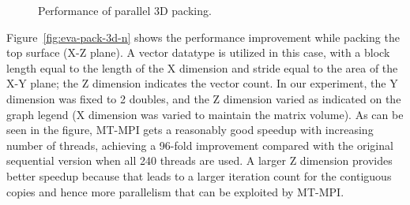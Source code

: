 \begin{figure}
\begin{center}
\end{center}
\vspace{-5.0ex}
\caption{Performance of parallel 3D packing.}
\vspace{-3.0ex}
\label{fig:eva-pack-3d}
\end{figure}

Figure~\ref{fig:eva-pack-3d-n} shows the performance improvement while
pac\-king the top surface (X-Z plane).  A vector datatype is utilized in
this case, with a block length equal to the length of the X dimension
and stride equal to the area of the X-Y plane; the Z dimension
indicates the vector count.  In our experiment, the Y dimension was
fixed to 2 doubles, and the Z dimension varied as indicated on the
graph legend (X dimension was varied to maintain the matrix volume).
As can be seen in the figure, MT-MPI gets a reasonably good speedup
with increasing number of threads, achieving a 96-fold improvement
compared with the original sequential version when all 240 threads are
used.  A larger Z dimension provides better speedup because that leads
to a larger iteration count for the contiguous copies and hence more
parallelism that can be exploited by MT-MPI.

